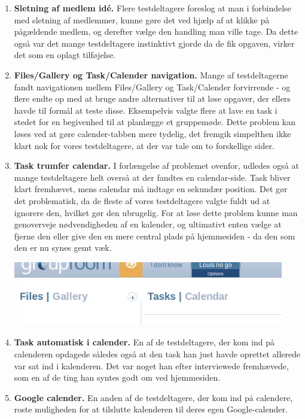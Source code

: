 \documentclass[12pt]{article}
\begin{document}
\begin{enumerate}
  \item \textbf{Sletning af medlem idé.} Flere testdeltagere foreslog at man i forbindelse med sletning af medlemmer, kunne gøre det ved hjælp af at klikke på pågældende medlem, og derefter vælge den handling man ville tage. Da dette også var det mange testdeltagere instinktivt gjorde da de fik opgaven, virker det som en oplagt tilføjelse.
  
  \item \textbf{Files/Gallery og Task/Calender navigation.} Mange af testdeltagerne fandt navigationen mellem Files/Gallery og Task/Calender forvirrende - og flere endte op med at bruge andre alternativer til at løse opgaver, der ellers havde til formål at teste disse. Eksempelvis valgte flere at lave en task i stedet for en begivenhed til at planlægge et gruppemøde. Dette problem kan løses ved at gøre calender-tabben mere tydelig, det fremgik simpelthen ikke klart nok for vores testdeltagere, at der var tale om to forskellige sider.

  \item \textbf{Task trumfer calendar.} I forlængelse af problemet ovenfor, udledes også at mange testdeltagere helt overså at der fandtes en calendar-side. Task bliver klart fremhævet, mens calendar må indtage en sekundær position. Det gør det problematisk, da de fleste af vores testdeltagere valgte fuldt ud at ignorere den, hvilket gør den ubrugelig. For at løse dette problem kunne man genoverveje nødvendigheden af en kalender, og ultimativt enten vælge at fjerne den eller give den en mere central plads på hjemmesiden - da den som den er nu synes gemt væk.
  
      \begin{center}\includegraphics[scale=0.5]{Billeder/taskvscalender}\end{center}
  \item \textbf{Task automatisk i calender.} En af de testdeltagere, der kom ind på calenderen opdagede således også at den task han just havde oprettet allerede var sat ind i kalenderen. Det var noget han efter interviewede fremhævede, som en af de ting han syntes godt om ved hjemmesiden.
  
  \item \textbf{Google calender.} En anden af de testdeltagere, der kom ind på calendere, roste muligheden for at tilslutte kalenderen til deres egen Google-calender.
    

\end{enumerate}
\end{document}
